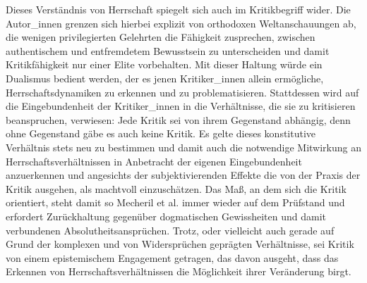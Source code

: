 Dieses Verständnis von Herrschaft
spiegelt sich auch im Kritikbegriff wider. Die Autor\_innen grenzen sich hierbei
explizit von orthodoxen Weltanschauungen ab, die wenigen privilegierten
Gelehrten die Fähigkeit zusprechen, zwischen authentischem und entfremdetem
Bewusstsein zu unterscheiden und damit Kritikfähigkeit nur einer Elite
vorbehalten. Mit dieser Haltung würde ein Dualismus bedient werden, der es
jenen Kritiker\_innen allein ermögliche, Herrschaftsdynamiken zu erkennen und zu
problematisieren. \footnotemark {} 
Stattdessen wird auf die Eingebundenheit der Kritiker\_innen
in die Verhältnisse, die sie zu kritisieren beanspruchen, verwiesen: Jede
Kritik sei von ihrem Gegenstand abhängig, denn ohne Gegenstand gäbe es auch
keine Kritik. Es gelte dieses konstitutive Verhältnis stets neu zu bestimmen
und damit auch die notwendige Mitwirkung an Herrschaftsverhältnissen in
Anbetracht der eigenen Eingebundenheit anzuerkennen und angesichts der
\glqq subjektivierenden Effekte\grqq\footnotemark {} die von der Praxis der Kritik ausgehen, als
machtvoll einzuschätzen. Das Maß, an dem sich die Kritik orientiert, steht
damit so Mecheril et al. immer wieder auf dem Prüfstand und erfordert
Zurückhaltung gegenüber dogmatischen Gewissheiten und damit verbundenen
Absolutheitsansprüchen.\footnotemark {} Trotz, oder vielleicht auch gerade auf Grund der
komplexen und von Widersprüchen geprägten Verhältnisse, sei Kritik von einem
epistemischem Engagement getragen, das davon ausgeht, dass das Erkennen von
Herrschaftsverhältnissen die Möglichkeit ihrer Veränderung birgt.\footnotemark
{}

